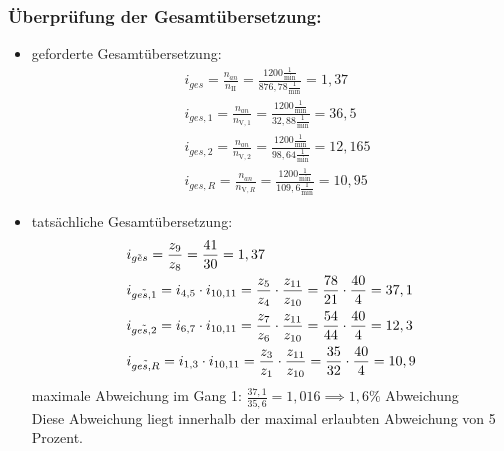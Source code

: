 \subsubsection{Überprüfung der Gesamtübersetzung:}
\begin{itemize}
\item geforderte Gesamtübersetzung:
\begin{align*}
	&i_{ges} = \frac{n_{an}}{n_{\mathrm{II}}} = \frac{1200 \frac{1}{\text{min}}}{876,78 \frac{1}{\text{min}}} = 1,37 \\
	&i_{ges,1} = \frac{n_{an}}{n_{\mathrm{V},1}} = \frac{1200 \frac{1}{\text{min}}}{32,88 \frac{1}{\text{min}}} = 36,5 \\
	&i_{ges,2} = \frac{n_{an}}{n_{\mathrm{V},2}} = \frac{1200 \frac{1}{\text{min}}}{98,64 \frac{1}{\text{min}}} = 12,165 \\
	&i_{ges,R} = \frac{n_{an}}{n_{\mathrm{V},R}} = \frac{1200 \frac{1}{\text{min}}}{109,6 \frac{1}{\text{min}}} = 10,95
\end{align*}

\item tatsächliche Gesamtübersetzung:
	\begin{align*}
	&i_{\tilde{ges}} = \frac{z_9}{z_8} = \frac{41}{30} = 1,37 \\
	&i_{\tilde{ges,1}} = i_{4,5} \cdot i_{10,11} = \frac{z_5}{z_4} \cdot \frac{z_{11}}{z_{10}} = \frac{78}{21} \cdot \frac{40}{4}= 37,1 \\
	&i_{\tilde{ges,2}} = i_{6,7} \cdot i_{10,11} = \frac{z_7}{z_6} \cdot \frac{z_{11}}{z_{10}} = \frac{54}{44} \cdot \frac{40}{4} = 12,3 \\
	&i_{\tilde{ges,R}} = i_{1,3} \cdot i_{10,11} = \frac{z_3}{z_1} \cdot \frac{z_{11}}{z_{10}} = \frac{35}{32} \cdot \frac{40}{4} = 10,9
	\end{align*}
maximale Abweichung im Gang 1: $\frac{37,1}{35,6} = 1,016 \implies 1,6 \% $ Abweichung \\
Diese Abweichung liegt innerhalb der maximal erlaubten Abweichung von 5 Prozent.
\end{itemize}